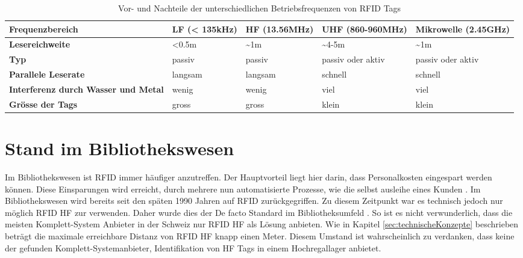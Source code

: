 \begin{table}[htb]
	\begin{tabularx}{\textwidth}{|X|X|X|X|X|}
		\hline
		\textbf{Frequenz\-bereich} & \textbf{LF (< 135kHz)} & \textbf{HF (13.56MHz)} & \textbf{UHF (860-960MHz)} & \textbf{Mikrowelle (2.45GHz)}\\
		\hline
		\textbf{Lesereichweite} & <0.5m & \textasciitilde 1m & \textasciitilde 4-5m & \textasciitilde 1m\\
		\hline
		\textbf{Typ} & passiv & passiv & passiv oder aktiv & passiv oder aktiv\\
		\hline
		\textbf{Parallele Leserate} & langsam & langsam & schnell & schnell \\
		\hline
		\textbf{Interferenz durch Wasser und Metal} & wenig & wenig & viel & viel \\
		\hline
		\textbf{Grösse der Tags} & gross & gross & klein & klein \\
		\hline
	\end{tabularx}
	\caption{Vor- und Nachteile der unterschiedlichen Betriebsfrequenzen von \gls{RFID} Tags \parencite{chawla2007}}
	\label{tbl:RFIDFrequencies}
\end{table}

\section{Stand im Bibliothekswesen}
Im Bibliothekswesen ist RFID immer häufiger anzutreffen. Der Hauptvorteil liegt hier darin, dass Personalkosten eingespart werden können. Diese Einsparungen wird erreicht, durch mehrere nun automatisierte Prozesse, wie die selbst ausleihe eines Kunden \parencite{Keller2010}.
Im Bibliothekswesen wird bereits seit den späten 1990 Jahren auf RFID zurückgegriffen. Zu diesem Zeitpunkt war es technisch jedoch nur möglich RFID HF zur verwenden. Daher wurde dies der De facto Standard im Bibliotheksumfeld \parencite{rfidHfVsUhf}. So ist es nicht verwunderlich, dass die meisten Komplett-System Anbieter in der Schweiz nur RFID HF als Lösung anbieten. Wie in Kapitel \ref{sec:technischeKonzepte} beschrieben beträgt die maximale erreichbare Distanz von RFID HF knapp einen Meter. Diesem Umstand ist wahrscheinlich zu verdanken, dass keine der gefunden Komplett-Systemanbieter, Identifikation von HF Tags in einem Hochregallager anbietet.

